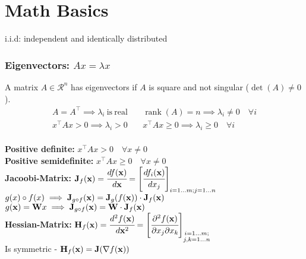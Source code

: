 \section{Math Basics}
\begin{mdframed}[style=redbox]
  i.i.d: independent and identically distributed
\end{mdframed}
\begin{mdframed}[style=eqbox]
\subsubsection*{Eigenvectors: \(A x = \lambda x\)}
A matrix $A \in \mathcal R^n$ has eigenvectors if $A$ is square and not singular (\(\det (A) \neq 0\)).
\vspace*{-4pt}\begin{align*}
  A = A^\top \implies \lambda_i \mathrm{~is~real~} && \operatorname*{rank}(A) = n \implies \lambda_i \neq 0 \quad \forall i\\
  x^\top A x > 0 \implies \lambda_i > 0 && x^\top A x \geq 0 \implies \lambda_i \geq 0 \quad \forall i
\end{align*}\vspace*{-16pt}\\
\textbf{Positive definite:} \(x^\top A x > 0 \quad \forall x \neq 0\)\\
\textbf{Positive semidefinite:} \(x^\top A x \geq 0 \quad \forall x \neq 0\)\\
\textbf{Jacoobi-Matrix:} \(\mathbf{J}_f(\mathbf{x}) = \cfrac{d f(\mathbf{x})}{d\mathbf{x}} = \left[\cfrac{df_i(\mathbf x)}{dx_j}\right]_{i = 1\dots m; j = 1\dots n}\)\\
$g(x) \circ f(x) \implies \mathbf{J}_{g \circ f} (\mathbf{x}) = \mathbf{J}_g(f(\mathbf{x})) \cdot \mathbf{J}_f(\mathbf{x})$\\[0.25em]
$g(\mathbf{x}) = \mathbf{W} x \implies \mathbf{J}_{g \circ f} (\mathbf{x}) = \mathbf{W} \cdot \mathbf{J}_f(\mathbf{x})$\\[0.35em]
\textbf{Hessian-Matrix:} \(\mathbf{H}_f(\mathbf{x}) = \cfrac{d^2 f(\mathbf{x})}{d\mathbf{x}^2} = \left[\cfrac{\partial^2 f(\mathbf{x})}{\partial x_j\partial x_k}\right]_{\substack{i = 1\dots m;\\ j, k = 1\dots n}}\)\\[-0.5em]
\small{Is symmetric - $\mathbf{H}_f(\mathbf{x}) = \mathbf{J}(\nabla f(\mathbf{x}))$}\\
\end{mdframed}
%
